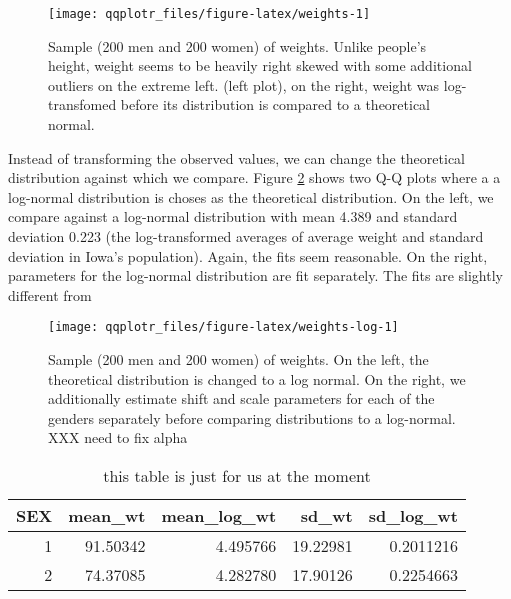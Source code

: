 \begin{Schunk}
\begin{figure}

{\centering \texttt{[image: qqplotr\_files/figure-latex/weights-1]} 

}

\caption[Sample (200 men and 200 women) of weights]{Sample (200 men and 200 women) of weights. Unlike people's height, weight seems to be heavily right skewed with some additional outliers on the extreme left. (left plot), on the right, weight was log-transfomed before its distribution is compared to a theoretical normal. }\label{fig:weights}
\end{figure}
\end{Schunk}

Instead of transforming the observed values, we can change the
theoretical distribution against which we compare. Figure
\ref{fig:weights-log} shows two Q-Q plots where a a log-normal
distribution is choses as the theoretical distribution. On the left, we
compare against a log-normal distribution with mean 4.389 and standard
deviation 0.223 (the log-transformed averages of average weight and
standard deviation in Iowa's population). Again, the fits seem
reasonable. On the right, parameters for the log-normal distribution are
fit separately. The fits are slightly different from

\begin{Schunk}
\begin{figure}

{\centering \texttt{[image: qqplotr\_files/figure-latex/weights-log-1]} 

}

\caption[Sample (200 men and 200 women) of weights]{Sample (200 men and 200 women) of weights. On the left, the theoretical distribution  is changed to a log normal. On the right, we additionally estimate shift and scale parameters for each of the genders separately before comparing distributions to a log-normal. XXX need to fix alpha}\label{fig:weights-log}
\end{figure}
\end{Schunk}

\begin{table}

\caption{\label{tab:table}this table is just for us at the moment}
\centering
\begin{tabular}[t]{r|r|r|r|r}
\hline
SEX & mean\_wt & mean\_log\_wt & sd\_wt & sd\_log\_wt\\
\hline
1 & 91.50342 & 4.495766 & 19.22981 & 0.2011216\\
\hline
2 & 74.37085 & 4.282780 & 17.90126 & 0.2254663\\
\hline
\end{tabular}
\end{table}

